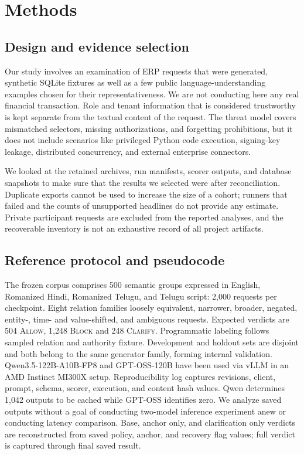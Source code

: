 \documentclass[pdflatex,sn-nature]{sn-jnl}
\newcommand{\allow}{\textsc{Allow}\xspace}
\newcommand{\block}{\textsc{Block}\xspace}
\newcommand{\clarify}{\textsc{Clarify}\xspace}
\begin{document}
\section{Methods}
\subsection{Design and evidence selection}
Our study involves an examination of ERP requests that were generated, synthetic SQLite fixtures as well as a few public language-understanding examples chosen for their representativeness. We are not conducting here any real financial transaction. Role and tenant information that is considered trustworthy is kept separate from the textual content of the request. The threat model covers mismatched selectors, missing authorizations, and forgetting prohibitions, but it does not include scenarios like privileged Python code execution, signing-key leakage, distributed concurrency, and external enterprise connectors.

We looked at the retained archives, run manifests, scorer outputs, and database snapshots to make sure that the results we selected were after reconciliation. Duplicate exports cannot be used to increase the size of a cohort; runners that failed and the counts of unsupported headlines do not provide any estimate. Private participant requests are excluded from
the reported analyses, and the recoverable
inventory is not an exhaustive record of all
project artifacts.

\subsection{Reference protocol and pseudocode}
The frozen corpus comprises 500 semantic groups expressed in English, Romanized Hindi, Romanized Telugu, and Telugu script: 2,000 requests per checkpoint. Eight relation families loosely equivalent, narrower, broader, negated, entity-, time- and value-shifted, and ambiguous requests. Expected verdicts are 504 \allow, 1,248 \block and 248 \clarify. Programmatic labeling follows sampled relation and authority fixture. Development and holdout sets are disjoint and both belong to the same generator family, forming internal validation. Qwen3.5-122B-A10B-FP8 and GPT-OSS-120B have been used via vLLM in an AMD Instinct MI300X setup. Reproducibility log captures revisions, client, prompt, schema, scorer, execution, and content hash values. Qwen determines 1,042 outputs to be cached while GPT-OSS identifies zero. We analyze saved outputs without a goal of conducting two-model inference experiment anew or conducting latency comparison. Base, anchor only, and clarification only verdicts are reconstructed from saved policy, anchor, and recovery flag values; full verdict is captured through final saved result.
\end{document}
